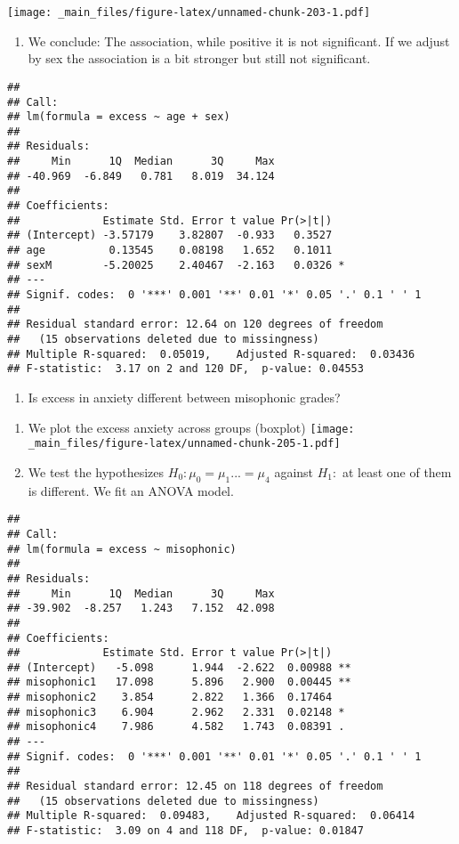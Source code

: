 \documentclass[
]{book}
\providecommand{\tightlist}{%
  \setlength{\itemsep}{0pt}\setlength{\parskip}{0pt}}
\begin{document}
\texttt{[image: \_main\_files/figure-latex/unnamed-chunk-203-1.pdf]}

\begin{enumerate}
\def\labelenumi{\alph{enumi}.}
\setcounter{enumi}{2}
\tightlist
\item
  We conclude: The association, while positive it is not significant. If we adjust by sex the association is a bit stronger but still not significant.
\end{enumerate}

\begin{verbatim}
## 
## Call:
## lm(formula = excess ~ age + sex)
## 
## Residuals:
##     Min      1Q  Median      3Q     Max 
## -40.969  -6.849   0.781   8.019  34.124 
## 
## Coefficients:
##             Estimate Std. Error t value Pr(>|t|)  
## (Intercept) -3.57179    3.82807  -0.933   0.3527  
## age          0.13545    0.08198   1.652   0.1011  
## sexM        -5.20025    2.40467  -2.163   0.0326 *
## ---
## Signif. codes:  0 '***' 0.001 '**' 0.01 '*' 0.05 '.' 0.1 ' ' 1
## 
## Residual standard error: 12.64 on 120 degrees of freedom
##   (15 observations deleted due to missingness)
## Multiple R-squared:  0.05019,    Adjusted R-squared:  0.03436 
## F-statistic:  3.17 on 2 and 120 DF,  p-value: 0.04553
\end{verbatim}

\begin{enumerate}
\def\labelenumi{\arabic{enumi}.}
\setcounter{enumi}{4}
\tightlist
\item
  Is excess in anxiety different between misophonic grades?
\end{enumerate}

\begin{enumerate}
\def\labelenumi{\alph{enumi}.}
\item
  We plot the excess anxiety across groups (boxplot)
  \texttt{[image: \_main\_files/figure-latex/unnamed-chunk-205-1.pdf]}
\item
  We test the hypothesizes \(H_0: \mu_{0}=\mu_{1} ... =\mu_{4}\) against \(H_1:\) at least one of them is different. We fit an ANOVA model.
\end{enumerate}

\begin{verbatim}
## 
## Call:
## lm(formula = excess ~ misophonic)
## 
## Residuals:
##     Min      1Q  Median      3Q     Max 
## -39.902  -8.257   1.243   7.152  42.098 
## 
## Coefficients:
##             Estimate Std. Error t value Pr(>|t|)   
## (Intercept)   -5.098      1.944  -2.622  0.00988 **
## misophonic1   17.098      5.896   2.900  0.00445 **
## misophonic2    3.854      2.822   1.366  0.17464   
## misophonic3    6.904      2.962   2.331  0.02148 * 
## misophonic4    7.986      4.582   1.743  0.08391 . 
## ---
## Signif. codes:  0 '***' 0.001 '**' 0.01 '*' 0.05 '.' 0.1 ' ' 1
## 
## Residual standard error: 12.45 on 118 degrees of freedom
##   (15 observations deleted due to missingness)
## Multiple R-squared:  0.09483,    Adjusted R-squared:  0.06414 
## F-statistic:  3.09 on 4 and 118 DF,  p-value: 0.01847
\end{verbatim}
\end{document}
